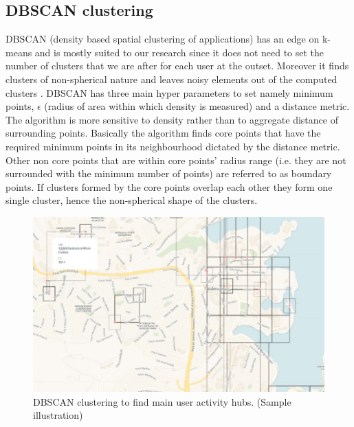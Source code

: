 \documentclass[12pt, a4paper]{report}
\theoremstyle{definition}
\theoremstyle{definition}%
\theoremstyle{definition}%
\theoremstyle{definition}%
\theoremstyle{definition}%
\theoremstyle{definition}%
\begin{document}
\subsection{DBSCAN clustering}  \label{subsection:methodology:dbscan_clustering}
DBSCAN (density based spatial clustering of applications) has an edge on k-means and is mostly suited to our research since it does not need to set the number of clusters that we are after for each user at the outset. Moreover it finds clusters of non-spherical nature and leaves noisy elements out of the computed clusters \cite{ChakrabortyNKNagwaniLopamudraDey2011}. DBSCAN has three main hyper parameters to set namely minimum points,  $\epsilon$ (radius of area within which density is measured)  and a distance metric. The algorithm is more sensitive to density rather than to aggregate distance of surrounding points. Basically the algorithm finds core points that have the required minimum points in its neighbourhood dictated by the distance metric. Other non core points that are within core points' radius range (i.e. they are not surrounded with the minimum number of points) are referred to as boundary points. If clusters formed by the core points overlap each other they form one single cluster, hence the non-spherical shape of the clusters.


\begin{figure}[h]	
	\includegraphics[scale=0.75]{clustering.jpg}
	\centering
	\caption{DBSCAN clustering to find main user activity hubs. (Sample illustration)}
	\label{fig:db_scan_clustering}
\end{figure}
 
\end{document}
